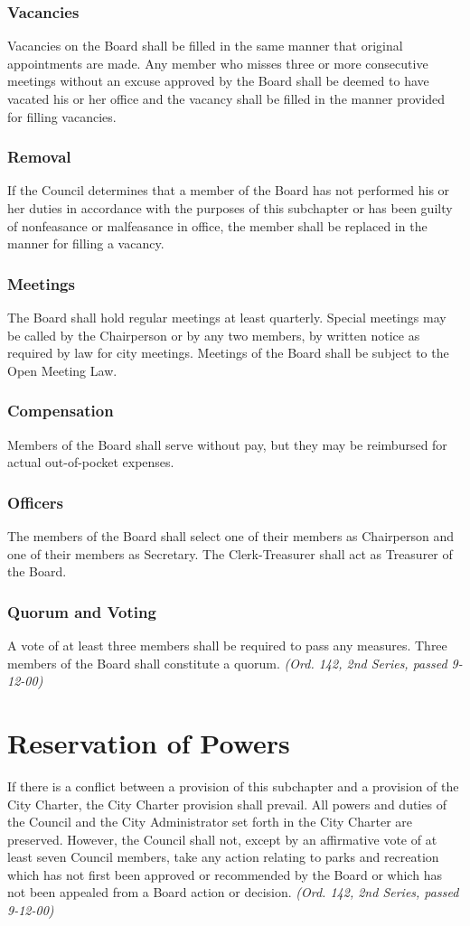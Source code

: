 \subsubsection{Vacancies}
Vacancies on the Board shall be filled in the same manner that original appointments are made. Any member who misses three or more consecutive meetings without an excuse approved by the Board shall be deemed to have vacated his or her office and the vacancy shall be filled in the manner provided for filling vacancies.
\subsubsection{Removal}
If the Council determines that a member of the Board has not performed his or her duties in accordance with the purposes of this subchapter or has been guilty of nonfeasance or malfeasance in office, the member shall be replaced in the manner for filling a vacancy.
\subsubsection{Meetings}
The Board shall hold regular meetings at least quarterly.  Special meetings may be called by the Chairperson or by any two members, by written notice as required by law for city meetings.  Meetings of the Board shall be subject to the Open Meeting Law.
\subsubsection{Compensation}
Members of the Board shall serve without pay, but they may be reimbursed for actual out-of-pocket expenses.
\subsubsection{Officers}
The members of the Board shall select one of their members as Chairperson and one of their members as Secretary.  The Clerk-Treasurer shall act as Treasurer of the Board.
\subsubsection{Quorum and Voting}
A vote of at least three members shall be required to pass any measures.  Three members of the Board shall constitute a quorum.\newline
\emph{(Ord. 142, 2nd Series, passed 9-12-00)}
\section{Reservation of Powers}
If there is a conflict between a provision of this subchapter and a provision of the City Charter, the City Charter provision shall prevail.  All powers and duties of the Council and the City Administrator set forth in the City Charter are preserved.  However, the Council shall not, except by an affirmative vote of at least seven Council members, take any action relating to parks and recreation which has not first been approved or recommended by the Board or which has not been appealed from a Board action or decision.\newline
\emph{(Ord. 142, 2nd Series, passed 9-12-00)}
